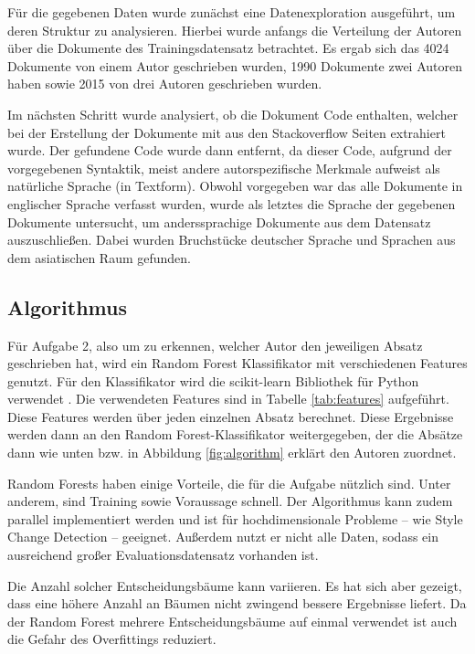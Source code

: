 \documentclass[conference]{IEEEtran}
\begin{document}
	
		Für die gegebenen Daten wurde zunächst eine Datenexploration ausgeführt, um deren Struktur zu analysieren. Hierbei wurde anfangs die Verteilung der Autoren über die Dokumente des Trainingsdatensatz betrachtet. Es ergab sich das 4024 Dokumente von einem Autor geschrieben wurden, 1990 Dokumente zwei Autoren haben sowie 2015 von drei Autoren geschrieben wurden.
		
		Im nächsten Schritt wurde analysiert, ob die Dokument Code enthalten, welcher bei der Erstellung der Dokumente mit aus den Stackoverflow Seiten extrahiert wurde. Der gefundene Code wurde dann entfernt, da dieser Code, aufgrund der vorgegebenen Syntaktik, meist andere autorspezifische Merkmale aufweist als natürliche Sprache (in Textform).
		Obwohl vorgegeben war das alle Dokumente in englischer Sprache verfasst wurden, wurde als letztes die Sprache der gegebenen Dokumente untersucht, um anderssprachige Dokumente aus dem Datensatz auszuschließen. Dabei wurden Bruchstücke deutscher Sprache und Sprachen aus dem asiatischen Raum gefunden.
		
\subsection{Algorithmus}
	Für Aufgabe 2, also um zu erkennen, welcher Autor den jeweiligen Absatz geschrieben hat, wird ein Random Forest Klassifikator mit verschiedenen Features genutzt. Für den Klassifikator wird die scikit-learn Bibliothek für Python verwendet \cite{ma_b1}. Die verwendeten Features sind in Tabelle \ref{tab:features} aufgeführt. Diese Features werden über jeden einzelnen Absatz berechnet. Diese Ergebnisse werden dann an den Random Forest-Klassifikator weitergegeben, der die Absätze dann wie unten bzw. in Abbildung \ref{fig:algorithm} erklärt den Autoren zuordnet.
	
	Random Forests haben einige Vorteile, die für die Aufgabe nützlich sind. Unter anderem, sind Training sowie Voraussage schnell. Der Algorithmus kann zudem parallel implementiert werden und ist für hochdimensionale Probleme – wie Style Change Detection – geeignet. \cite{ma_b2} Außerdem nutzt er nicht alle Daten, sodass ein ausreichend großer Evaluationsdatensatz vorhanden ist.
	
	Die Anzahl solcher Entscheidungsbäume kann variieren. Es hat sich aber gezeigt, dass eine höhere Anzahl an Bäumen nicht zwingend bessere Ergebnisse liefert. Da der Random Forest mehrere Entscheidungsbäume auf einmal verwendet ist auch die Gefahr des Overfittings reduziert. \cite{ma_b2}
	
\end{document}
